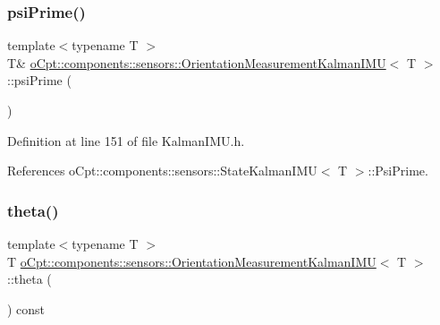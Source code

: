 \subsubsection{\texorpdfstring{psi\+Prime()}{psiPrime()}\hspace{0.1cm}{\footnotesize\ttfamily [2/2]}}
{\footnotesize\ttfamily template$<$typename T $>$ \\
T\& \hyperlink{classo_cpt_1_1components_1_1sensors_1_1_orientation_measurement_kalman_i_m_u}{o\+Cpt\+::components\+::sensors\+::\+Orientation\+Measurement\+Kalman\+I\+MU}$<$ T $>$\+::psi\+Prime (\begin{DoxyParamCaption}{ }\end{DoxyParamCaption})\hspace{0.3cm}{\ttfamily [inline]}}



Definition at line 151 of file Kalman\+I\+M\+U.\+h.



References o\+Cpt\+::components\+::sensors\+::\+State\+Kalman\+I\+M\+U$<$ T $>$\+::\+Psi\+Prime.

\hypertarget{classo_cpt_1_1components_1_1sensors_1_1_orientation_measurement_kalman_i_m_u_a40e67cce56f1ac577ad2f0aef699aaaa}{}\label{classo_cpt_1_1components_1_1sensors_1_1_orientation_measurement_kalman_i_m_u_a40e67cce56f1ac577ad2f0aef699aaaa} 
\subsubsection{\texorpdfstring{theta()}{theta()}\hspace{0.1cm}{\footnotesize\ttfamily [1/2]}}
{\footnotesize\ttfamily template$<$typename T $>$ \\
T \hyperlink{classo_cpt_1_1components_1_1sensors_1_1_orientation_measurement_kalman_i_m_u}{o\+Cpt\+::components\+::sensors\+::\+Orientation\+Measurement\+Kalman\+I\+MU}$<$ T $>$\+::theta (\begin{DoxyParamCaption}{ }\end{DoxyParamCaption}) const\hspace{0.3cm}{\ttfamily [inline]}}



